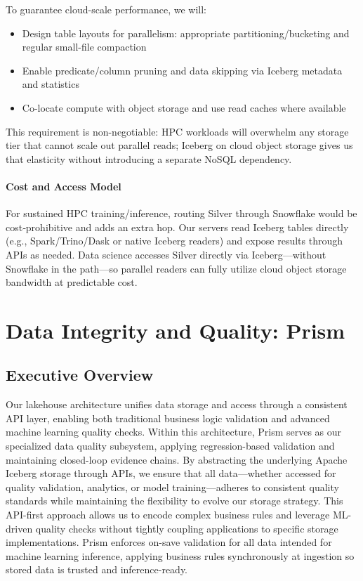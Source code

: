 \documentclass[12pt, a4paper]{article}
\begin{document}
To guarantee cloud-scale performance, we will:
\begin{itemize}[leftmargin=*, nosep]
    \item Design table layouts for parallelism: appropriate partitioning/bucketing and regular small-file compaction
    \item Enable predicate/column pruning and data skipping via Iceberg metadata and statistics
    \item Co-locate compute with object storage and use read caches where available
\end{itemize}
This requirement is non-negotiable: HPC workloads will overwhelm any storage tier that cannot scale out parallel reads; Iceberg on cloud object storage gives us that elasticity without introducing a separate NoSQL dependency.

\paragraph{Cost and Access Model}
For sustained HPC training/inference, routing Silver through Snowflake would be cost‑prohibitive and adds an extra hop. Our servers read Iceberg tables directly (e.g., Spark/Trino/Dask or native Iceberg readers) and expose results through APIs as needed. Data science accesses Silver directly via Iceberg—without Snowflake in the path—so parallel readers can fully utilize cloud object storage bandwidth at predictable cost.

\section{Data Integrity and Quality: Prism}

\subsection{Executive Overview}
Our lakehouse architecture unifies data storage and access through a consistent API layer, enabling both traditional business logic validation and advanced machine learning quality checks. Within this architecture, Prism serves as our specialized data quality subsystem, applying regression-based validation and maintaining closed-loop evidence chains. By abstracting the underlying Apache Iceberg storage through APIs, we ensure that all data—whether accessed for quality validation, analytics, or model training—adheres to consistent quality standards while maintaining the flexibility to evolve our storage strategy. This API-first approach allows us to encode complex business rules and leverage ML-driven quality checks without tightly coupling applications to specific storage implementations. Prism enforces on-save validation for all data intended for machine learning inference, applying business rules synchronously at ingestion so stored data is trusted and inference-ready.
\end{document}
